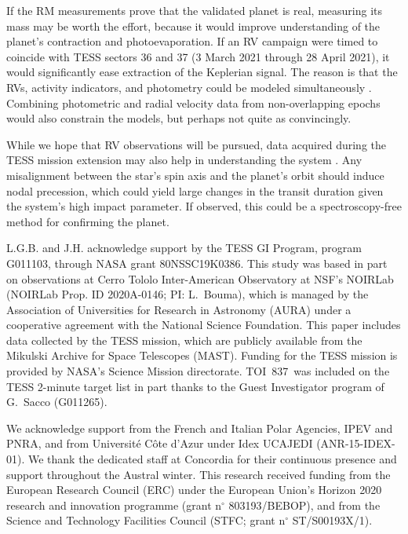 \documentclass[12pt,twocolumn,tighten]{aastex63}
\newcommand{\tn}{TOI~837} %
\begin{document}
If the RM measurements prove that the validated planet is real,
measuring its mass may be worth the effort, because it would improve
understanding of the planet's contraction and photoevaporation.  If an
RV campaign were timed to coincide with TESS sectors 36 and 37 (3
March 2021 through 28 April 2021), it would significantly ease
extraction of the Keplerian signal.  The reason is that the RVs,
activity indicators, and photometry could be modeled simultaneously
\citep[{\it e.g.},][]{aigrain_simple_2012,rajpaul_gaussian_2015}.
Combining photometric and radial velocity data from non-overlapping
epochs would also constrain the models, but perhaps not quite as
convincingly.

While we hope that RV observations will be pursued, data acquired
during the TESS mission extension may also help in understanding the
system \citep{bouma_extend_2017,huang_expected_2018}.  Any
misalignment between the star's spin axis and the planet's orbit
should induce nodal precession, which could yield large changes in the
transit duration given the system's high impact parameter.  If
observed, this could be a spectroscopy-free method for confirming the
planet.





\clearpage
\acknowledgements
\raggedbottom

L.G.B. and J.H. acknowledge support by the TESS GI Program, program
G011103, through NASA grant 80NSSC19K0386.
%
This study was based in part on observations at Cerro Tololo
Inter-American Observatory at NSF’s NOIRLab (NOIRLab Prop. ID
2020A-0146; PI: L{.}~Bouma), which is managed by the Association of
Universities for Research in Astronomy (AURA) under a cooperative
agreement with the National Science Foundation.
%
This paper includes data collected by the TESS mission, which are
publicly available from the Mikulski Archive for Space Telescopes
(MAST).
%
Funding for the TESS mission is provided by NASA's Science Mission
directorate.  \tn\ was included on the TESS 2-minute target list in
part thanks to the Guest Investigator program of G.\ Sacco (G011265).
%

We acknowledge support from the French and Italian Polar Agencies,
IPEV and PNRA, and from Universit\'e C\^ote d’Azur under Idex UCAJEDI
(ANR-15-IDEX-01). We thank the dedicated staff at Concordia for their
continuous presence and support throughout the Austral winter.
%
This research received funding from the European Research Council
(ERC) under the European Union's Horizon 2020 research and innovation
programme (grant n$^\circ$ 803193/BEBOP), and from the
Science and Technology Facilities Council (STFC; grant n$^\circ$
ST/S00193X/1).
%
%
\end{document}
